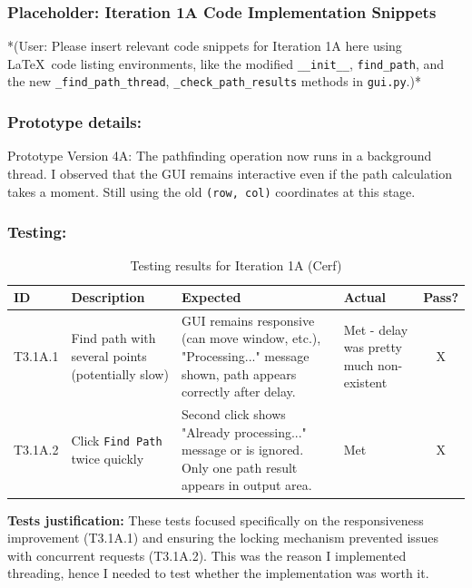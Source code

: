 \newpage
\subsubsection*{Placeholder: Iteration 1A Code Implementation Snippets}
*(User: Please insert relevant code snippets for Iteration 1A here using \LaTeX\ code listing environments, like the modified \verb|__init__|, \verb|find_path|, and the new \verb|_find_path_thread|, \verb|_check_path_results| methods in \verb|gui.py|.)*
\newpage

\subsubsection{Prototype details:}
Prototype Version 4A: The pathfinding operation now runs in a background thread. I observed that the GUI remains interactive even if the path calculation takes a moment. Still using the old \verb|(row, col)| coordinates at this stage.

\subsubsection{Testing:}
\begin{table}[htbp]
	\centering
	\begin{tabularx}{\textwidth}{|l|X|p{4.5cm}|p{1.5cm}|c|}
		\hline
		\textbf{ID} & \textbf{Description} & \textbf{Expected} & \textbf{Actual} & \textbf{Pass?} \\
		\hline
		T3.1A.1 & Find path with several points (potentially slow) & GUI remains responsive (can move window, etc.), "Processing..." message shown, path appears correctly after delay. & Met - delay was pretty much non-existent & X \\
		\hline
		T3.1A.2 & Click \verb|Find Path| twice quickly & Second click shows "Already processing..." message or is ignored. Only one path result appears in output area. & Met & X \\
		\hline
	\end{tabularx}
	\caption{Testing results for Iteration 1A (Cerf)}
\end{table}
\textbf{Tests justification:} These tests focused specifically on the responsiveness improvement (T3.1A.1) and ensuring the locking mechanism prevented issues with concurrent requests (T3.1A.2). This was the reason I implemented threading, hence I needed to test whether the implementation was worth it.

